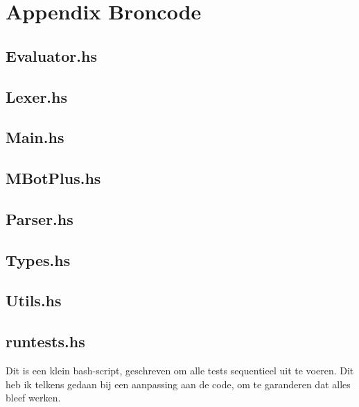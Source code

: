 \documentclass[12pt,a4paper]{report}
\begin{document}
\chapter{Appendix Broncode}

\section{Evaluator.hs}

\newpage
\section{Lexer.hs}

\newpage
\section{Main.hs}

\newpage
\section{MBotPlus.hs}

\newpage
\section{Parser.hs}

\newpage
\section{Types.hs}

\newpage
\section{Utils.hs}

\section{runtests.hs}
Dit is een klein bash-script, geschreven om alle tests sequentieel uit te voeren. Dit heb ik telkens gedaan bij een aanpassing aan de code, om te garanderen dat alles bleef werken.

\end{document}
